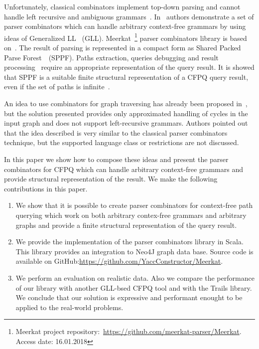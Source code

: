 Unfortunately, classical combinators implement top-down parsing and cannot handle left recursive and ambiguous grammars~\cite{!!!}.
In~\cite{Meerkat} authors demonstrate a set of parser combinators which can handle arbitrary context-free grammars by using ideas of Generalized LL~\cite{scott2010gll} (GLL).
Meerkat~\footnote{Meerkat project repository:~\url{https://github.com/meerkat-parser/Meerkat}. Access date: 16.01.2018} parser combinators library is based on~\cite{Meerkat}. The result of parsing is represented in a compact form as Shared Packed Parse Forest~\cite{SPPF}~(SPPF).
Paths extraction, queries debugging and result processing~\cite{structForDebugging} require an appropriate representation of the query result. It is showed that SPPF is a suitable finite structural representation of a CFPQ query result, even if the set of paths is infinite~\cite{GrigorevR16}. 

An idea to use combinators for graph traversing has already been proposed in~\cite{ScalaGraphParsing}, but the solution presented provides only approximated handling of cycles in the input graph and does not support left-recursive grammars. 
Authors pointed out that the idea described is very similar to the classical parser combinators technique, but the supported language class or restrictions are not discussed.

In this paper we show how to compose these ideas and present the parser combinators for CFPQ which can handle arbitrary context-free grammars and provide structural representation of the result.
We make the following contributions in this paper.

\begin{enumerate}
\item We show that it is possible to create parser combinators for context-free path querying which work on both arbitrary contex-free grammars and arbitrary graphs and provide a finite structural representation of the query result.
\item We provide the implementation of the parser combinators library in Scala. This library provides an integration to Neo4J graph data base. Source code is available on GitHub:\url{https://github.com/YaccConstructor/Meerkat}.
\item We perform an evaluation on realistic data. 
Also we compare the performance of our library with another GLL-bsed CFPQ tool and with the Trails library.
We conclude that our solution is expressive and performant enought to be applied to the real-world problems. 
\end{enumerate}